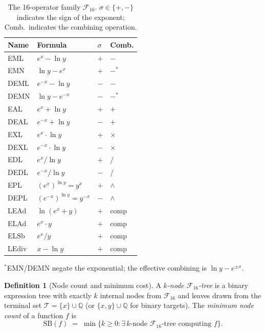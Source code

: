 \documentclass[12pt,a4paper]{article}
\theoremstyle{definition}
\newtheorem{definition}[theorem]{Definition}
\newcommand{\F}{\mathcal{F}_{16}}
\newcommand{\SB}{\mathrm{SB}}
\begin{document}
\begin{table}[h]
\centering
\caption{The 16-operator family $\F$.  $\sigma\in\{+,-\}$ indicates the
sign of the exponent; Comb.\ indicates the combining operation.}
\label{tab:F16}
\smallskip
\begin{tabular}{@{}llll@{}}
\toprule
\textbf{Name} & \textbf{Formula} & \textbf{$\sigma$} & \textbf{Comb.} \\
\midrule
EML  & $e^{x}-\ln y$          & $+$ & $-$ \\
EMN  & $\ln y - e^{x}$        & $+$ & $-^*$ \\
DEML & $e^{-x}-\ln y$         & $-$ & $-$ \\
DEMN & $\ln y - e^{-x}$       & $-$ & $-^*$ \\
EAL  & $e^{x}+\ln y$          & $+$ & $+$ \\
DEAL & $e^{-x}+\ln y$         & $-$ & $+$ \\
EXL  & $e^{x}\cdot\ln y$      & $+$ & $\times$ \\
DEXL & $e^{-x}\cdot\ln y$     & $-$ & $\times$ \\
EDL  & $e^{x}/\ln y$          & $+$ & $/$ \\
DEDL & $e^{-x}/\ln y$         & $-$ & $/$ \\
EPL  & $(e^{x})^{\ln y}=y^x$  & $+$ & $\wedge$ \\
DEPL & $(e^{-x})^{\ln y}=y^{-x}$ & $-$ & $\wedge$ \\
LEAd & $\ln(e^x+y)$           & $+$ & comp \\
ELAd & $e^x\cdot y$           & $+$ & comp \\
ELSb & $e^x / y$              & $+$ & comp \\
LEdiv& $x - \ln y$            & $+$ & comp \\
\bottomrule
\end{tabular}

\smallskip
\footnotesize{$^*$EMN/DEMN negate the exponential; the effective
combining is $\ln y - e^{\pm x}$.}
\end{table}

\begin{definition}[Node count and minimum cost]\label{def:mincost}
A \emph{$k$-node $\F$-tree} is a binary expression tree with exactly
$k$ internal nodes from $\F$ and leaves drawn from the terminal set
$\mathcal{T} = \{x\} \cup \mathbb{Q}$ (or $\{x,y\} \cup \mathbb{Q}$ for
binary targets).  The \emph{minimum node count} of a function $f$ is
\[
  \SB(f) \;=\; \min\{k \geq 0 : \exists\,\text{$k$-node $\F$-tree computing $f$}\}.
\]
\end{definition}
\end{document}
